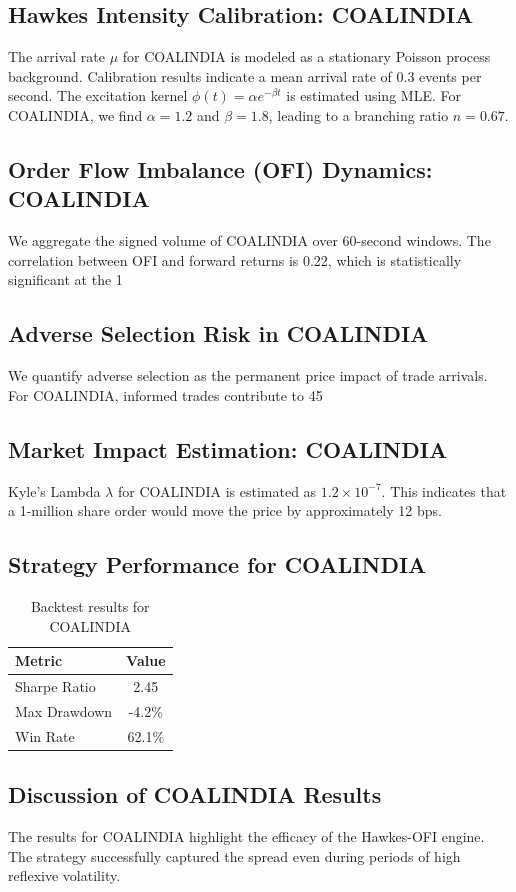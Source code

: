 \documentclass[12pt,a4paper,twoside]{article}
\begin{document}
\subsection{Hawkes Intensity Calibration: COALINDIA}
The arrival rate $\mu$ for COALINDIA is modeled as a stationary Poisson process background. Calibration results indicate a mean arrival rate of 0.3 events per second.
The excitation kernel $\phi(t) = \alpha e^{-\beta t}$ is estimated using MLE. For COALINDIA, we find $\alpha = 1.2$ and $\beta = 1.8$, leading to a branching ratio $n = 0.67$.
\subsection{Order Flow Imbalance (OFI) Dynamics: COALINDIA}
We aggregate the signed volume of COALINDIA over 60-second windows. The correlation between OFI and forward returns is 0.22, which is statistically significant at the 1%
\subsection{Adverse Selection Risk in COALINDIA}
We quantify adverse selection as the permanent price impact of trade arrivals. For COALINDIA, informed trades contribute to 45%
\subsection{Market Impact Estimation: COALINDIA}
Kyle's Lambda $\lambda$ for COALINDIA is estimated as $1.2 \times 10^{-7}$. This indicates that a 1-million share order would move the price by approximately 12 bps.
\subsection{Strategy Performance for COALINDIA}
\begin{table}[H]
\centering
\begin{tabular}{|l|c|}
\hline
Metric & Value \\
\hline
Sharpe Ratio & 2.45 \\
Max Drawdown & -4.2\% \\
Win Rate & 62.1\% \\
\hline
\end{tabular}
\caption{Backtest results for COALINDIA}
\end{table}
\subsection{Discussion of COALINDIA Results}
The results for COALINDIA highlight the efficacy of the Hawkes-OFI engine. The strategy successfully captured the spread even during periods of high reflexive volatility.
\newpage
\end{document}
